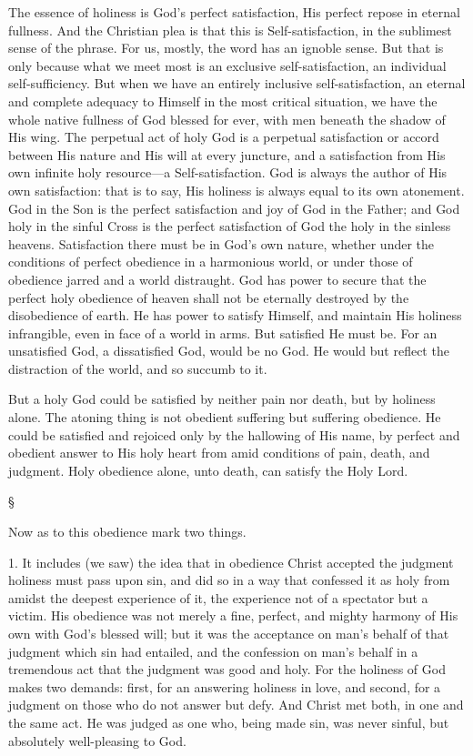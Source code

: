 \documentclass[12pt,letterpaper,oneside]{book}
\begin{document}
The essence of holiness is God's perfect 
satisfaction, His perfect repose in eternal fullness. 
And the Christian plea is that this is 
Self-satisfaction, in the sublimest sense of the 
phrase. For us, mostly, the word has an ignoble 
sense. But that is only because what we meet 
most is an exclusive self-satisfaction, an individual 
self-sufficiency. But when we have 
an entirely inclusive self-satisfaction, an eternal 
and complete adequacy to Himself in the most 
critical situation, we have the whole native fullness 
of God blessed for ever, with men beneath 
the shadow of His wing. The perpetual act of 
holy God is a perpetual satisfaction or accord 
between His nature and His will at every juncture, 
and a satisfaction from His own infinite 
holy resource---a Self-satisfaction. God is always 
the author of His own satisfaction: that is to say, 
His holiness is always equal to its own atonement. 
God in the Son is the perfect satisfaction 
and joy of God in the Father; and God holy 
in the sinful Cross is the perfect satisfaction of 
God the holy in the sinless heavens. Satisfaction 
there must be in God's own nature, whether 
under the conditions of perfect obedience in a 
harmonious world, or under those of obedience 
jarred and a world distraught. God has power 
to secure that the perfect holy obedience of 
heaven shall not be eternally destroyed by the 
disobedience of earth. He has power to satisfy 
Himself, and maintain His holiness infrangible, 
even in face of a world in arms. But satisfied He 
must be. For an unsatisfied God, a dissatisfied 
God, would be no God. He would but reflect the 
distraction of the world, and so succumb to it. 

But a holy God could be satisfied by neither 
pain nor death, but by holiness alone. The 
atoning thing is not obedient suffering but 
suffering obedience. He could be satisfied and 
rejoiced only by the hallowing of His name, 
by perfect and obedient answer to His holy 
heart from amid conditions of pain, death, and 
judgment. Holy obedience alone, unto death, 
can satisfy the Holy Lord. 

\begin{center}
\S
\end{center}

Now as to this obedience mark two things. 

1. It includes (we saw) the idea that in obedience 
Christ accepted the judgment holiness 
must pass upon sin, and did so in a way that 
confessed it as holy from amidst the deepest 
experience of it, the experience not of a spectator 
but a victim. His obedience was not 
merely a fine, perfect, and mighty harmony 
of His own with God's blessed will; but it 
was the acceptance on man's behalf of that 
judgment which sin had entailed, and the confession 
on man's behalf in a tremendous act 
that the judgment was good and holy. For the 
holiness of God makes two demands: first, for 
an answering holiness in love, and second, for a 
judgment on those who do not answer but defy. 
And Christ met both, in one and the same act. 
He was judged as one who, being made sin, was 
never sinful, but absolutely well-pleasing to God. 
\end{document}
